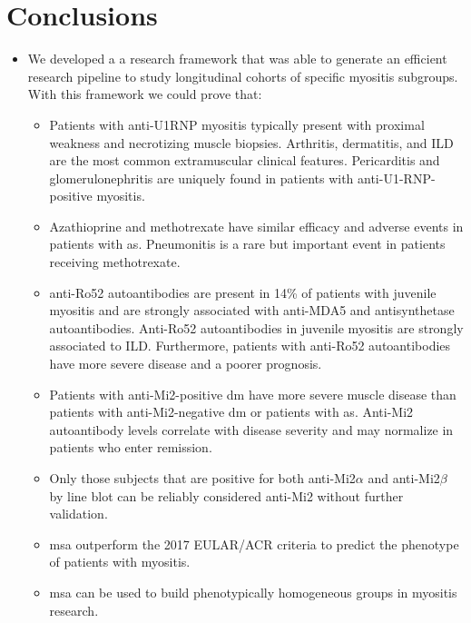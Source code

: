 \chapter{Conclusions}

\begin{itemize}
	
	\item We developed a a research framework that was able to generate an efficient research pipeline to study longitudinal cohorts of specific myositis subgroups. With this framework we could prove that:
	\begin{itemize}
		\item Patients with anti-U1RNP myositis typically present with proximal weakness and necrotizing muscle biopsies. Arthritis, dermatitis, and ILD are the most common extramuscular clinical features. Pericarditis and glomerulonephritis are uniquely found in patients with anti-U1-RNP- positive myositis.
		
		\item Azathioprine and methotrexate have similar efficacy and adverse events in patients with \gls{as}. Pneumonitis is a rare but important event in patients receiving methotrexate.
		
		\item anti-Ro52 autoantibodies are present in 14\% of patients with juvenile myositis and are strongly associated with anti-MDA5 and antisynthetase autoantibodies. Anti-Ro52 autoantibodies in juvenile myositis are strongly associated to ILD. Furthermore, patients with anti-Ro52 autoantibodies have more severe disease and a poorer prognosis.
		
		\item Patients with anti-Mi2-positive \gls{dm} have more severe muscle disease than patients with anti-Mi2-negative \gls{dm} or patients with \gls{as}. Anti-Mi2 autoantibody levels correlate with disease severity and may normalize in patients who enter remission.
		
		\item Only those subjects that are positive for both anti-Mi2$\alpha$ and anti-Mi2$\beta$ by line blot can be reliably considered anti-Mi2 without further validation.
		
		\item \gls{msa} outperform the 2017 EULAR/ACR criteria to predict the phenotype of patients with myositis.
		
		\item \gls{msa} can be used to build phenotypically homogeneous groups in myositis research.
	\end{itemize}


\end{itemize}
